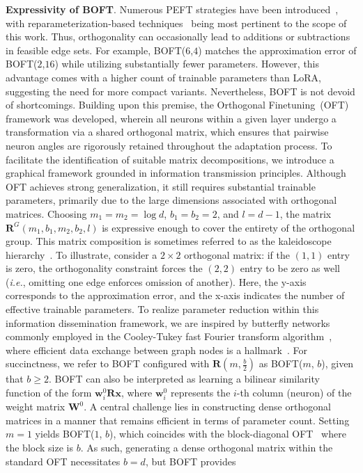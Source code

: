 \begin{itemize}[leftmargin=*,nosep]
\textbf{Expressivity of BOFT}. Numerous PEFT strategies have been introduced~\cite{houlsby2019parameter,aghajanyan2020intrinsic,hulora2022,edalati2022krona,wang2022adamix,gheini2021cross,zaken2022bitfit,guo2020parameter,sung2021training,ansell2022composable,lester2021power,li2021prefix,vu2022spot,he2021towards,mao2021unipelt,karimi2021compacter,liu2022few,sung2022lst,chen2022parameter,jia2022visual,chen2022adaptformer,zhang2022neural,jie2023fact,lian2022scaling,luo2023towards}, with reparameterization-based techniques~\cite{aghajanyan2020intrinsic,hulora2022,edalati2022krona} being most pertinent to the scope of this work. Thus, orthogonality can occasionally lead to additions or subtractions in feasible edge sets. For example, BOFT($6$,$4$) matches the approximation error of BOFT($2$,$16$) while utilizing substantially fewer parameters. However, this advantage comes with a higher count of trainable parameters than LoRA, suggesting the need for more compact variants. Nevertheless, BOFT is not devoid of shortcomings. Building upon this premise, the Orthogonal Finetuning~(OFT)~\cite{qiu2023controlling} framework was developed, wherein all neurons within a given layer undergo a transformation via a shared orthogonal matrix, which ensures that pairwise neuron angles are rigorously retained throughout the adaptation process. To facilitate the identification of suitable matrix decompositions, we introduce a graphical framework grounded in information transmission principles. Although OFT achieves strong generalization, it still requires substantial trainable parameters, primarily due to the large dimensions associated with orthogonal matrices. Choosing $m_1=m_2=\log d$, $b_1=b_2=2$, and $l=d-1$, the matrix $\bm{R}^G(m_1,b_1,m_2,b_2,l)$ is expressive enough to cover the entirety of the orthogonal group. This matrix composition is sometimes referred to as the kaleidoscope hierarchy~\cite{dao2019kaleidoscope}. To illustrate, consider a $2\times 2$ orthogonal matrix: if the $(1,1)$ entry is zero, the orthogonality constraint forces the $(2,2)$ entry to be zero as well (\emph{i.e.}, omitting one edge enforces omission of another). Here, the y-axis corresponds to the approximation error, and the x-axis indicates the number of effective trainable parameters. To realize parameter reduction within this information dissemination framework, we are inspired by butterfly networks commonly employed in the Cooley-Tukey fast Fourier transform algorithm~\cite{cooley1965algorithm}, where efficient data exchange between graph nodes is a hallmark~\cite{klasing1994broadcasting}. For succinctness, we refer to BOFT configured with $\bm{R}(m, \frac{b}{2})$ as BOFT($m$, $b$), given that $b \geq 2$. BOFT can also be interpreted as learning a bilinear similarity function of the form $\bm{w}^0_i\bm{R}\bm{x}$, where $\bm{w}^0_i$ represents the $i$-th column (neuron) of the weight matrix $\bm{W}^0$. A central challenge lies in constructing dense orthogonal matrices in a manner that remains efficient in terms of parameter count. Setting $m = 1$ yields BOFT($1$, $b$), which coincides with the block-diagonal OFT~\cite{qiu2023controlling} where the block size is $b$. As such, generating a dense orthogonal matrix within the standard OFT necessitates $b = d$, but BOFT provides 
\end{itemize}
